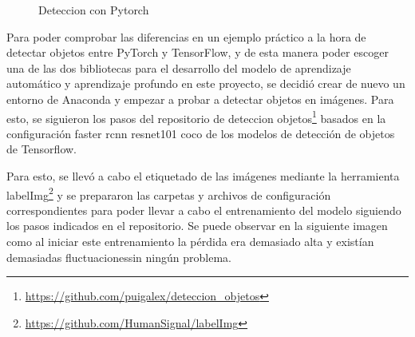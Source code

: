   \begin{figure}[H]
    \begin{center}
      \subcapcentertrue
      \hspace{2mm}
    \end{center}
    \caption{Deteccion con Pytorch}
    \label{fig:Deteccion_Pytorch}
  \end{figure}

Para poder comprobar las diferencias en un ejemplo práctico a la hora de detectar objetos entre PyTorch y TensorFlow, y de esta manera poder escoger una de las dos bibliotecas para el desarrollo del modelo de aprendizaje automático y aprendizaje profundo en este proyecto, se decidió crear de nuevo un entorno de Anaconda y empezar a probar a detectar objetos en imágenes. Para esto, se siguieron los pasos del repositorio de deteccion objetos\footnote{\url{https://github.com/puigalex/deteccion_objetos}} basados en la configuración faster rcnn resnet101 coco de los modelos de detección de objetos de Tensorflow.

Para esto, se llevó a cabo el etiquetado de las imágenes mediante la herramienta labelImg\footnote{\url{https://github.com/HumanSignal/labelImg}} y se prepararon las carpetas y archivos de configuración correspondientes para poder llevar a cabo el entrenamiento del modelo siguiendo los pasos indicados en el repositorio. 
Se puede observar en la siguiente imagen como al iniciar este entrenamiento la pérdida era demasiado alta y existían demasiadas fluctuacionessin ningún problema.

